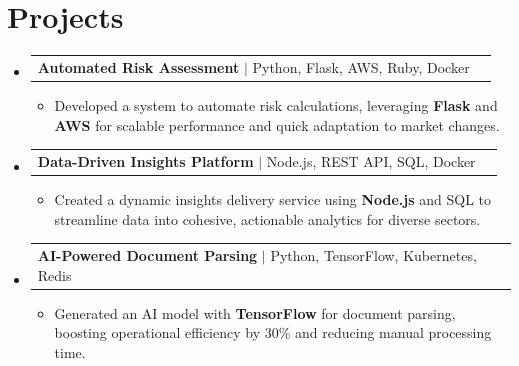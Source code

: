 \documentclass[letterpaper,11pt]{article}
\makeatletter
\newcommand{\resumeItem}[1]{
  \item\footnotesize{
    {#1 \vspace{-2pt}}
  }
}
\newcommand{\resumeProjectHeading}[2]{
    \item
    \begin{tabular*}{1.001\textwidth}{l@{\extracolsep{\fill}}r}
      \small#1 & \textbf{\small #2}\\
    \end{tabular*}\vspace{-7pt}
}
\newcommand{\resumeSubHeadingListStart}{\begin{itemize}[leftmargin=0pt, label={}]}
\newcommand{\resumeSubHeadingListEnd}{\end{itemize}}
\newcommand{\resumeItemListStart}{\begin{itemize}[leftmargin=*]}
\newcommand{\resumeItemListEnd}{\end{itemize}\vspace{-5pt}}
\makeatother
\begin{document}
\section{Projects}
    \vspace{-5pt}
    \resumeSubHeadingListStart

      \resumeProjectHeading
          {\textbf{Automated Risk Assessment} $|$ Python, Flask, AWS, Ruby, Docker}{ }
        \resumeItemListStart
            \resumeItem{Developed a system to automate risk calculations, leveraging \textbf{Flask} and \textbf{AWS} for scalable performance and quick adaptation to market changes.}
        \resumeItemListEnd
        \vspace{-12pt}

      \resumeProjectHeading
          {\textbf{Data-Driven Insights Platform} $|$ Node.js, REST API, SQL, Docker}{ }
        \resumeItemListStart
            \resumeItem{Created a dynamic insights delivery service using \textbf{Node.js} and SQL to streamline data into cohesive, actionable analytics for diverse sectors.}
        \resumeItemListEnd
        \vspace{-12pt}

      \resumeProjectHeading
          {\textbf{AI-Powered Document Parsing} $|$ Python, TensorFlow, Kubernetes, Redis}{ }
        \resumeItemListStart
            \resumeItem{Generated an AI model with \textbf{TensorFlow} for document parsing, boosting operational efficiency by 30\% and reducing manual processing time.}
        \resumeItemListEnd

    \resumeSubHeadingListEnd
\end{document}
